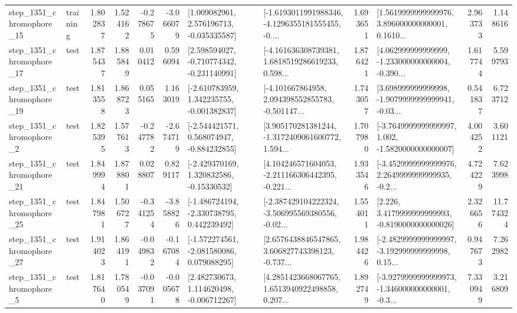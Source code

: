 \begin{tabular}{llrrrrllrlrr}
 step\_1351\_chromophore\_15 &  training &      1.802837 &    1.524162 &     -0.278675 & -3.066079 &    [1.009082961, 2.576196713, -0.035335587] &  [-1.6193011991988346, -4.1296355181555455, -0.... &       1.693651 &  [1.5619999999999976, 3.896000000000001, 0.1610... &            2.963733 &          1.148616 \\
 step\_1351\_chromophore\_17 &      test &      1.875437 &    1.885849 &      0.010412 &  0.596094 &   [2.598594027, -0.710774342, -0.231140991] &  [-4.161636308739381, 1.6818519286619233, 0.598... &       1.876421 &  [4.062999999999999, -1.233000000000004, -0.390... &            1.617744 &          5.599793 \\
 step\_1351\_chromophore\_19 &      test &      1.813558 &    1.868723 &      0.055165 &  1.163019 &   [-2.610783959, 1.342235755, -0.001382837] &  [-4.101667864958, 2.094398552855783, -0.501147... &       1.743057 &  [3.698999999999998, -1.9079999999999941, -0.03... &            0.541837 &          6.723712 \\
  step\_1351\_chromophore\_2 &      test &      1.825395 &    1.577613 &     -0.247782 & -2.674719 &   [-2.544421571, 0.568074947, -0.884232855] &  [3.905170281381244, -1.3172409061600772, 1.594... &       1.707980 &  [-3.7649999999999997, 1.002, -1.5820000000000007] &            4.004252 &          3.601121 \\
 step\_1351\_chromophore\_21 &      test &      1.849994 &    1.878801 &      0.028807 &  0.829117 &    [-2.429370169, 1.320832586, -0.15330532] &  [4.104246571604053, -2.211166306442395, -0.221... &       1.933546 &  [-3.4529999999999976, 2.2649999999999935, -0.2... &            4.724229 &          7.623998 \\
 step\_1351\_chromophore\_25 &      test &      1.847981 &    1.506727 &     -0.341254 & -3.858826 &   [-1.486724194, -2.330738795, 0.442239492] &  [-2.387429104222324, -3.506995569380556, -0.02... &       1.554011 &   [2.226, 3.4179999999999993, -0.8190000000000026] &            2.326656 &         11.774324 \\
 step\_1351\_chromophore\_27 &      test &      1.914023 &    1.864191 &     -0.049832 & -0.167084 &   [-1.572274561, -2.081580086, 0.079088295] &  [2.6576438846547865, 3.606827743398123, -0.737... &       1.984426 &  [-2.4829999999999997, -3.192999999999998, 0.15... &            0.947673 &          7.262982 \\
  step\_1351\_chromophore\_5 &      test &      1.817640 &    1.780549 &     -0.037091 & -0.005678 &    [2.482730673, 1.114620498, -0.006712267] &  [4.2851423668067765, 1.6513940922498858, 0.207... &       1.892749 &  [-3.9279999999999973, -1.346000000000001, -0.3... &            7.330949 &          3.216809 \\

\end{tabular}
